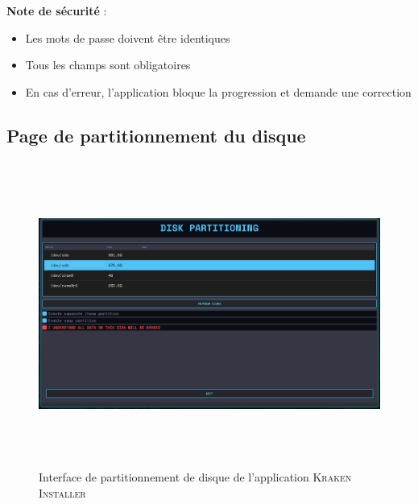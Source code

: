 \textbf{Note de sécurité} : 
\begin{itemize}
    \item Les mots de passe doivent être identiques
    \item Tous les champs sont obligatoires
    \item En cas d'erreur, l'application bloque la progression et demande une correction
\end{itemize}



\subsection{Page de partitionnement du disque}

\begin{figure}[H]
  \centering
  \includegraphics[width=1\textwidth, height=10cm]{images_pfe/disk.png}
  \caption{Interface de partitionnement de disque de l'application \textsc{Kraken Installer}}
  \label{fig:diskpage}
\end{figure}

\label{subsec:disk-partitioning}

